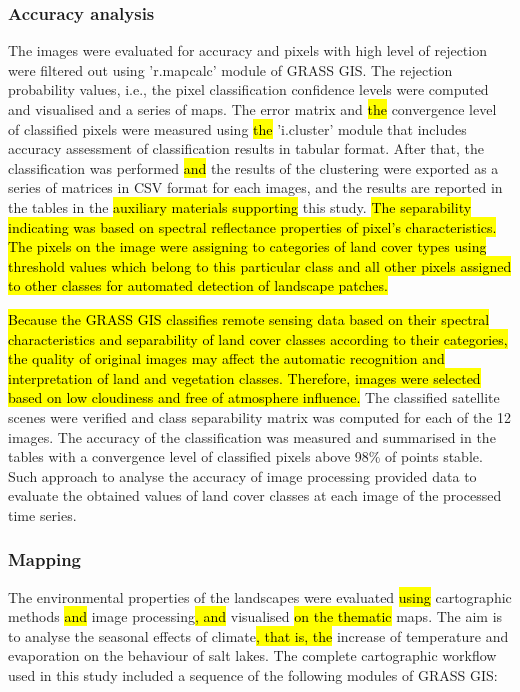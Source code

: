 \documentclass[land,article,submit,pdftex,moreauthors]{Definitions/mdpi}
\begin{document}

 \subsubsection{Accuracy analysis}

The images were evaluated for accuracy and pixels with high level of rejection were filtered out using 'r.mapcalc' module of GRASS GIS. The rejection probability values, i.e., the pixel classification confidence levels were computed and visualised and a series of maps. The error matrix and \hl{the }convergence level of classified pixels were measured using \hl{the }'i.cluster' module that includes accuracy assessment of classification results in tabular format. After that, the classification was performed \hl{and} the results of the clustering were exported as a series of matrices in CSV format for each images, and the results are reported in the tables in the \hl{auxiliary materials supporting }this study. \hl{The separability indicating was based on spectral reflectance properties of pixel's characteristics. The pixels on the image were assigning to categories of land cover types using threshold values which belong to this particular class and all other pixels assigned to other classes for automated detection of landscape patches. }

\hl{Because the GRASS GIS classifies remote sensing data based on their spectral characteristics and separability of land cover classes according to their categories, the quality of original images may affect the automatic recognition and interpretation of land and vegetation classes. Therefore, images were selected based on low cloudiness and free of atmosphere influence. }The classified satellite scenes were verified and class separability matrix was computed for each of the 12 images. The accuracy of the classification was measured and summarised in the tables with a convergence level of classified pixels above 98\% of points stable. Such approach to analyse the accuracy of image processing provided data to evaluate the obtained values of land cover classes at each image of the processed time series.
 
 \subsubsection{Mapping}

The environmental properties of the landscapes were evaluated \hl{using} cartographic methods \hl{and} image processing\hl{, and}  visualised \hl{on the thematic }maps. The aim is to analyse the seasonal effects of climate\hl{, that is, the }increase of temperature and evaporation\hl{ }on the behaviour of salt lakes. The complete cartographic workflow used in this study included a sequence of the following modules of GRASS GIS:
\end{document}
